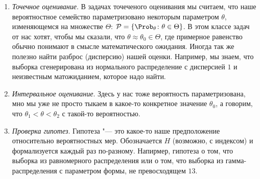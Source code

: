 \documentclass[../TV&MS.tex]{subfiles}
\begin{document}
\begin{enumerate}
    \item \textit{Точечное оценивание}. В задачах точеченого оценивания мы
        считаем, что наше вероятностное семейство параметризовано некоторым
        параметром $\theta$, изменяющемся на множестве $\Theta$:
        $\mathcal{P} = \Set{\Prob_{\theta}}{\theta \in \Theta}$.
        В этом классе задач от нас хотят, чтобы мы сказали, что 
        $\theta \approx \theta_0 \in \Theta$, где примерное равенство обычно
        понимают в смысле математического ожидания. Иногда так же полезно
        найти разброс (дисперсию) нашей оценки. Например, мы знаем, что
        выборка сгенерирована из нормального распределение с дисперсией $1$ и
        неизвестным матожиданием, которое надо найти.
    
    \item \textit{Интервальное оценивание}. Здесь у нас тоже вероятность
        параметризована, мно мы уже не просто тыкаем в какое-то конкретное
        значение $\theta_0$, а говорим, что $\theta_1 < \theta < \theta_2$ с
        такой-то вероятностью.

    \item \textit{Проверка гипотез}. Гипотеза "--- это какое-то наше
        предположение относительно вероятностных мер. Обозначается $H$ 
        (возможно, с индексом) и формализуется каждый раз по-разному.
        Напирмер, гипотеза о том, что выборка из равномерного распределения
        или о том, что выборка из гамма-распределения с параметром формы, не
        превосходящем $13$.
\end{enumerate} 

\newpage
\end{document}
